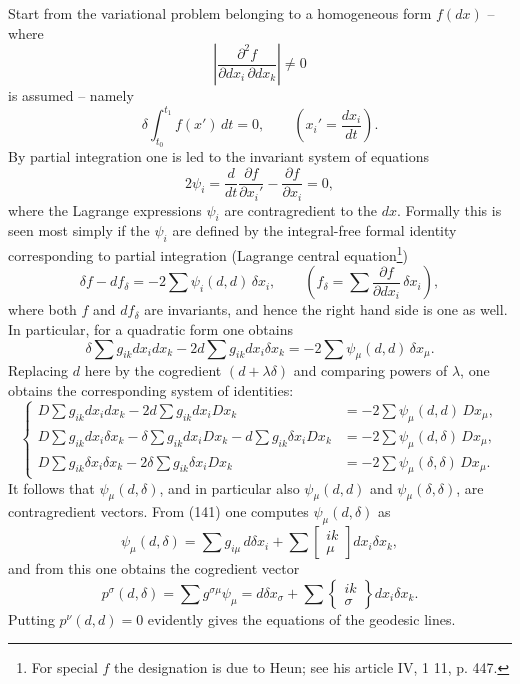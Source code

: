 \documentclass[11pt]{article}
\begin{document}
Start from the variational problem belonging to a homogeneous form $f(dx)$ -- where
\[
\left|\frac{\partial^2 f}{\partial dx_i\,\partial dx_k}\right|\ne0
\]
is assumed -- namely
\begin{equation}
 \delta\int_{t_0}^{t_1} f(x')\,dt=0,
 \qquad \left(x_i'=\frac{dx_i}{dt}\right).
\tag{140}
\end{equation}
By partial integration one is led to the invariant system of equations
\[
 2\psi_i=\frac{d}{dt}\frac{\partial f}{\partial x_i'}-\frac{\partial f}{\partial x_i}=0,
\]
where the Lagrange expressions $\psi_i$ are contragredient to the $dx$. Formally this is seen most simply if the $\psi_i$ are defined by the integral-free formal identity corresponding to partial integration (Lagrange central equation\footnote{For special $f$ the designation is due to Heun; see his article IV, 1 11, p. 447.})
\[
 \delta f-df_\delta=-2\sum\psi_i(d,d)\,\delta x_i,
 \qquad
 \left(f_\delta=\sum\frac{\partial f}{\partial dx_i}\,\delta x_i\right),
\]
where both $f$ and $df_\delta$ are invariants, and hence the right hand side is one as well. In particular, for a quadratic form one obtains
\[
 \delta\sum g_{ik}dx_i dx_k-2d\sum g_{ik}dx_i\delta x_k
 =-2\sum\psi_\mu(d,d)\,\delta x_\mu.
\]
Replacing $d$ here by the cogredient $(d+\lambda\delta)$ and comparing powers of $\lambda$, one obtains the corresponding system of identities:
\begin{equation}
\left\{
\begin{aligned}
D\sum g_{ik}dx_i dx_k-2d\sum g_{ik}dx_iDx_k
   &=-2\sum\psi_\mu(d,d)\,Dx_\mu,\\
D\sum g_{ik}dx_i\delta x_k-\delta\sum g_{ik}dx_iDx_k
   -d\sum g_{ik}\delta x_iDx_k
   &=-2\sum\psi_\mu(d,\delta)\,Dx_\mu,\\
D\sum g_{ik}\delta x_i\delta x_k-2\delta\sum g_{ik}\delta x_iDx_k
   &=-2\sum\psi_\mu(\delta,\delta)\,Dx_\mu.
\end{aligned}
\right.
\tag{141}
\end{equation}
It follows that $\psi_\mu(d,\delta)$, and in particular also $\psi_\mu(d,d)$ and $\psi_\mu(\delta,\delta)$, are contragredient vectors. From (141) one computes $\psi_\mu(d,\delta)$ as
\[
 \psi_\mu(d,\delta)=\sum g_{i\mu}\,d\delta x_i+
 \sum\left[\begin{smallmatrix}ik\\ \mu\end{smallmatrix}\right]dx_i\delta x_k,
\]
and from this one obtains the cogredient vector
\begin{equation}
 p^\sigma(d,\delta)=\sum g^{\sigma\mu}\psi_\mu
 =d\delta x_\sigma+
 \sum\left\{\begin{smallmatrix}ik\\ \sigma\end{smallmatrix}\right\}dx_i\delta x_k.
\tag{142}
\end{equation}
Putting $p^\nu(d,d)=0$ evidently gives the equations of the geodesic lines.
\end{document}
